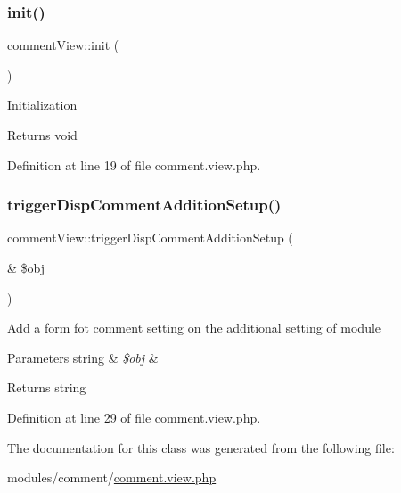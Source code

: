\subsubsection{\texorpdfstring{init()}{init()}}
{\footnotesize\ttfamily comment\+View\+::init (\begin{DoxyParamCaption}{ }\end{DoxyParamCaption})}

Initialization \begin{DoxyReturn}{Returns}
void 
\end{DoxyReturn}


Definition at line 19 of file comment.\+view.\+php.

\hypertarget{classcommentView_ad2504c48d3411458dcdd88d1d681aba7}{}\label{classcommentView_ad2504c48d3411458dcdd88d1d681aba7} 
\subsubsection{\texorpdfstring{trigger\+Disp\+Comment\+Addition\+Setup()}{triggerDispCommentAdditionSetup()}}
{\footnotesize\ttfamily comment\+View\+::trigger\+Disp\+Comment\+Addition\+Setup (\begin{DoxyParamCaption}\item[{\&}]{\$obj }\end{DoxyParamCaption})}

Add a form fot comment setting on the additional setting of module 
\begin{DoxyParams}[1]{Parameters}
string & {\em \$obj} & \\
\hline
\end{DoxyParams}
\begin{DoxyReturn}{Returns}
string 
\end{DoxyReturn}


Definition at line 29 of file comment.\+view.\+php.



The documentation for this class was generated from the following file\+:\begin{DoxyCompactItemize}
\item 
modules/comment/\hyperlink{comment_8view_8php}{comment.\+view.\+php}\end{DoxyCompactItemize}
